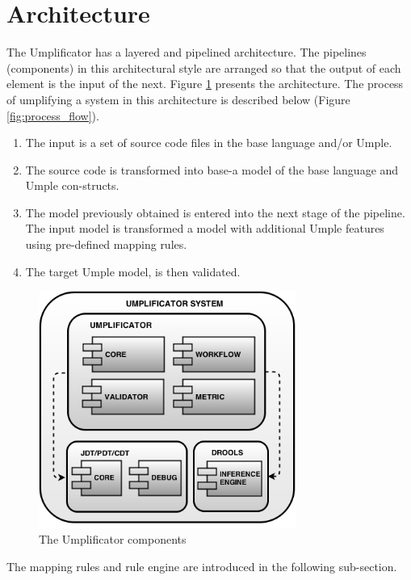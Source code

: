 \section{Architecture}
The Umplificator has a layered and pipelined architecture. The pipelines (components) in this architectural style are arranged so that the output of each element is the input of the next.  Figure \ref{fig:architecture} presents the architecture.
The process of umplifying a system in this architecture is described below (Figure   \ref{fig:process_flow}). 
\begin{enumerate}
\item The input is a set of source code files in the base language and/or Umple.
\item The source code is transformed into base-a model of the base language and Umple con-structs.
\item The model previously obtained is entered into the next stage of the pipeline. The input model is transformed a model with additional Umple features using pre-defined mapping rules. 
\item The target Umple model, is then validated. 
\end{enumerate}

\begin{figure}[h]
\centering
\includegraphics[width=0.75\textwidth]{Figures/UmplificatorComponents.png} 
\caption{The Umplificator components}
\label{fig:architecture}
\end{figure}

The mapping rules and rule engine are introduced in the following sub-section. 

